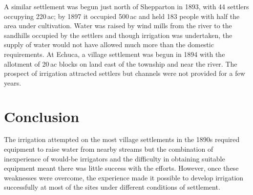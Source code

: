 A similar settlement was begun just north of Shepparton in 1893, with
44 settlers occupying 220\,ac; by 1897 it occupied 500\,ac and held
183 people with half the area under cultivation.  Water was raised by
wind mills from the river to the sandhills occupied by the settlers
and though irrigation was undertaken, the supply of water would not
have allowed much more than the domestic requirements.  At Echuca, a
village settlement was begun in 1894 with the allotment of 20\,ac
blocks on land east of the township and near the river.  The prospect
of irrigation attracted settlers but channels were not provided for a
few years.

\section*{Conclusion}

The irrigation attempted on the most village settlements in the 1890s
required equipment to raise water from nearby streams but the
combination of inexperience of would-be irrigators and the difficulty
in obtaining suitable equipment meant there was little success with
the efforts.  However, once these weaknesses were overcome, the
experience made it possible to develop irrigation successfully at most
of the sites under different conditions of settlement.

